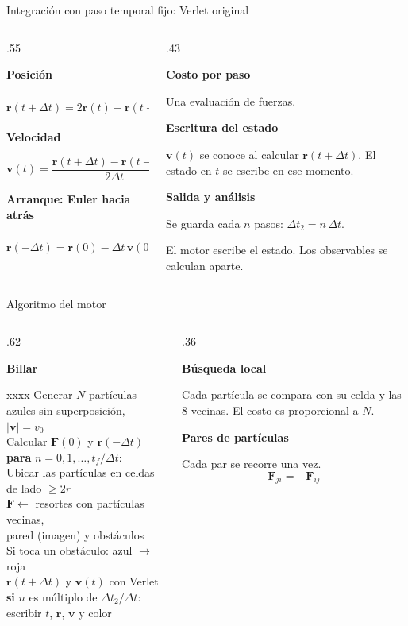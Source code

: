 \documentclass[aspectratio=169,11pt]{beamer}
\newcommand{\vect}[1]{\mathbf{#1}}
\newcommand{\dt}{\Delta t}
\newcommand{\ficha}[3][itbablue]{%
  \par
  \begingroup
    \begin{minipage}{\linewidth}
    {\small\bfseries\color{#1}#2\par}\vspace{3pt}
    {\small\raggedright
      \setlength{\abovedisplayskip}{4pt}
      \setlength{\belowdisplayskip}{4pt}
      \setlength{\abovedisplayshortskip}{3pt}
      \setlength{\belowdisplayshortskip}{3pt}
      #3\par}
    \end{minipage}
  \endgroup\par\vspace{9pt}}
\begin{document}
\begin{frame}{Integración con paso temporal fijo: Verlet original}
\begin{columns}[c,onlytextwidth]
\begin{column}{.55\textwidth}
\ficha{Posición}{%
\[\vect r(t+\dt)=2\vect r(t)-\vect r(t-\dt)+\frac{\dt^2}{m}\vect F(t)\]}
\ficha{Velocidad}{%
\[\vect v(t)=\frac{\vect r(t+\dt)-\vect r(t-\dt)}{2\dt}\]}
\ficha{Arranque: Euler hacia atrás}{%
\[\vect r(-\dt)=\vect r(0)-\dt\,\vect v(0)+\frac{\dt^2}{2m}\vect F(0)\]}
\end{column}
\begin{column}{.43\textwidth}
\ficha{Costo por paso}{Una evaluación de fuerzas.}
\ficha{Escritura del estado}{%
  $\vect v(t)$ se conoce al calcular $\vect r(t+\dt)$. El estado en $t$ se escribe en ese momento.}
\ficha{Salida y análisis}{%
  Se guarda cada $n$ pasos: $\dt_2=n\,\dt$.\par\smallskip
  El motor escribe el estado. Los observables se calculan aparte.}
\end{column}
\end{columns}
\end{frame}

\begin{frame}{Algoritmo del motor}
\begin{columns}[c,onlytextwidth]
\begin{column}{.62\textwidth}
\ficha{Billar}{%
\begin{tabbing}
xx\=xx\=\kill
Generar $N$ partículas azules sin superposición, $|\vect v|=v_0$\\
Calcular $\vect F(0)$ y $\vect r(-\dt)$\\
\textbf{para} $n=0,1,\dots,t_f/\dt$:\\
\> Ubicar las partículas en celdas de lado $\geq 2r$\\
\> $\vect F\leftarrow$ resortes con partículas vecinas,\\
\> \> pared (imagen) y obstáculos\\
\> Si toca un obstáculo: azul $\to$ roja\\
\> $\vect r(t+\dt)$ y $\vect v(t)$ con Verlet\\
\> \textbf{si} $n$ es múltiplo de $\dt_2/\dt$: escribir $t$, $\vect r$, $\vect v$ y color
\end{tabbing}
}
\end{column}
\begin{column}{.36\textwidth}
\ficha{Búsqueda local}{%
Cada partícula se compara con su celda y las 8 vecinas. El costo es proporcional a $N$.}
\ficha{Pares de partículas}{%
Cada par se recorre una vez.
\[\vect F_{ji}=-\vect F_{ij}\]}
\end{column}
\end{columns}
\end{frame}
\end{document}
